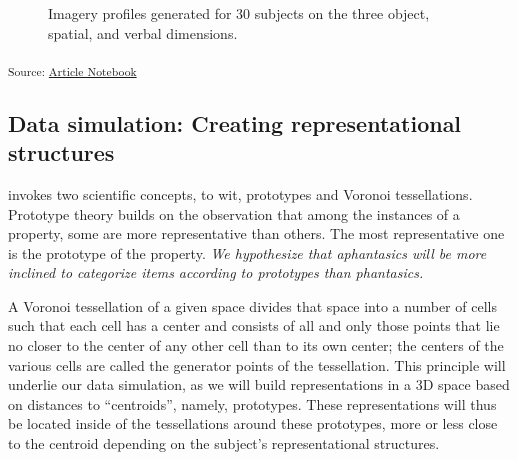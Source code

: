 \documentclass[
  authoryear]{elsarticle}
\begin{document}
\label{cell-fig-osv-model}
\begin{figure}[H]


\caption{\label{fig-osv-model}Imagery profiles generated for 30 subjects
on the three object, spatial, and verbal dimensions.}

\end{figure}%

\textsubscript{Source:
\href{https://m-delem.github.io/2499-similarity-manuscript/index.qmd.html}{Article
Notebook}}

\subsection{Data simulation: Creating representational
structures}\label{data-simulation-creating-representational-structures}

\citet{gardenforsConceptualSpacesFramework2004} invokes two scientific
concepts, to wit, prototypes and Voronoi tessellations. Prototype theory
builds on the observation that among the instances of a property, some
are more representative than others. The most representative one is the
prototype of the property. \emph{We hypothesize that aphantasics will be
more inclined to categorize items according to prototypes than
phantasics.}

A Voronoi tessellation of a given space divides that space into a number
of cells such that each cell has a center and consists of all and only
those points that lie no closer to the center of any other cell than to
its own center; the centers of the various cells are called the
generator points of the tessellation. This principle will underlie our
data simulation, as we will build representations in a 3D space based on
distances to ``centroids'', namely, prototypes. These representations
will thus be located inside of the tessellations around these
prototypes, more or less close to the centroid depending on the
subject's representational structures.
\end{document}
